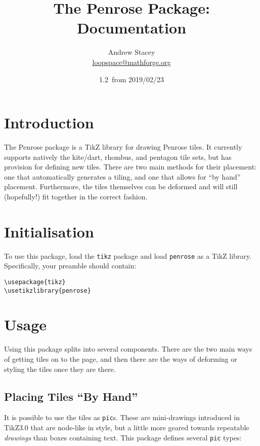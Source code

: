 \documentclass{ltxdoc}
\title{The \textsf{Penrose} Package: Documentation}
\author{Andrew Stacey\texorpdfstring{\\ \url{loopspace@mathforge.org}}{}}
\date{1.2~from 2019/02/23}
\begin{document}
\maketitle

\tableofcontents
  
\section{Introduction}

The \textsf{Penrose} package is a TikZ library for drawing Penrose tiles.
It currently supports natively the kite/dart, rhombus, and pentagon tile sets, but has provision for defining new tiles.
There are two main methods for their placement: one that automatically generates a tiling, and one that allows for ``by hand'' placement.
Furthermore, the tiles themselves can be deformed and will still (hopefully!) fit together in the correct fashion.

\section{Initialisation}

To use this package, load the \Verb+tikz+ package and load \Verb+penrose+ as a TikZ library.
Specifically, your preamble should contain:

\begin{verbatim}
\usepackage{tikz}
\usetikzlibrary{penrose}
\end{verbatim}

\section{Usage}

Using this package splits into several components.
There are the two main ways of getting tiles on to the page, and then there are the ways of deforming or styling the tiles once they are there.

\subsection{Placing Tiles ``By Hand''}

It is possible to use the tiles as \Verb+pic+s.
These are mini-drawings introduced in TikZ3.0 that are node-like in style, but a little more geared towards repeatable \emph{drawings} than boxes containing text.
This package defines several \Verb+pic+ types:

\end{document}
